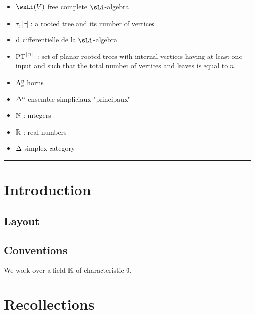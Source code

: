 \documentclass[twoside, 10pt]{amsart}
\begin{document}
\begin{itemize}
\item $\wsLi(V)$ free complete $\sLi$-algebra 
\item $\tau, |\tau|$ : a rooted tree and its number of vertices 
\item $\d$ differentielle de la $\sLi$-algebra
\item $\mathrm{PT}^{[n]}$ : set of planar rooted trees with internal vertices having at least one input  and such that the total number of vertices and leaves is equal to $n$. 
\item $\Ho{k}{n}$ horns 
\item $\De{n}$ ensemble simpliciaux "principaux"
\item $\NN$ : integers
\item $\RR$ : real numbers 
\item $\cD$ simplex category
\end{itemize}
\hrule



\section*{Introduction}

%
%


\subsection*{Layout}

\subsection*{Conventions}\leavevmode


We work over a field $\k$ of characteristic $0$. 



\section{Recollections \bruno{[Bruno]}}
\end{document}
